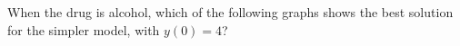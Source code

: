 \documentclass{ximera}
\begin{document}
\begin{question}
When the drug is alcohol, which of the following graphs shows the best solution for the simpler model, with $y(0)=4$?
\begin{multipleChoice}
\end{multipleChoice}


\end{question}
\end{document}
